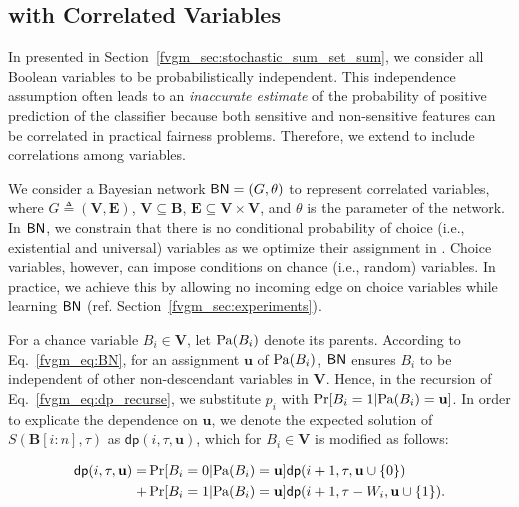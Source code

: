 	
\subsection{{\stochastic} with Correlated Variables} 
\label{fvgm_sec:dp_with_BN}
In {\stochastic} presented in Section~\ref{fvgm_sec:stochastic_sum_set_sum}, we consider all  Boolean variables to be probabilistically independent. This independence assumption often leads to an \textit{inaccurate estimate} of the probability of positive prediction of the classifier because both sensitive and non-sensitive features can be correlated in practical fairness problems. Therefore, we extend {\stochastic} to include correlations among variables.

We consider a Bayesian network $ \mathsf{BN} = (G, \theta) $ to represent correlated variables, where $ G \triangleq (\mathbf{V}, \mathbf{E}) $, $ \mathbf{V} \subseteq \mathbf{B} $, $ \mathbf{E} \subseteq \mathbf{V} \times \mathbf{V}  $, and $ \theta $ is the parameter of the network.  In  $ \mathsf{BN} $, we constrain that there is no conditional probability of choice (i.e., existential and universal) variables as we optimize their assignment in {\stochastic}. Choice variables, however, can impose conditions on chance (i.e., random) variables. In practice, we achieve this by allowing no incoming edge on choice variables while learning $ \mathsf{BN} $ (ref. Section~\ref{fvgm_sec:experiments}).
   	
   	

For a chance variable $ B_i \in \mathbf{V} $, let $ \mathrm{Pa}(B_i) $ denote its parents. According to Eq.~\eqref{fvgm_eq:BN},  for an assignment $ \mathbf{u} $ of $ \mathrm{Pa}(B_i) $, $ \mathsf{BN} $ ensures $ B_i $ to be independent of other non-descendant variables in $ \mathbf{V} $. Hence, in the recursion of Eq.~\eqref{fvgm_eq:dp_recurse}, we substitute  $ p_i $  with  $ \Pr[B_i = 1| \mathrm{Pa}(B_i) = \mathbf{u}] $. In order to explicate the dependence on $ \mathbf{u} $, we denote the expected solution of $ S(\mathbf{B}[i:n], \tau) $ as 
$ \mathsf{dp}(i, \tau, \mathbf{u}) $, which for $ B_i \in \mathbf{V} $ is modified as follows:

\begin{align*}
	\mathsf{dp}(i,  \tau, \mathbf{u}) = & \Pr[B_i = 0| \mathrm{Pa}(B_i) = \mathbf{u}] \mathsf{dp}(i+1, \tau, \mathbf{u} \cup \{0\})  \\
	 + & \Pr[B_i = 1| \mathrm{Pa}(B_i) = \mathbf{u}]  \mathsf{dp}(i+1, \tau-W_i, \mathbf{u} \cup \{1\}).
\end{align*}

